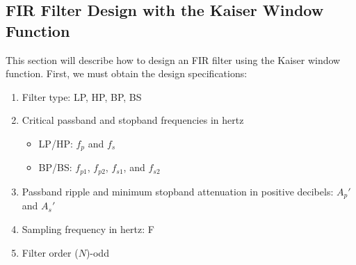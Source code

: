 \documentclass[11pt]{book}
\theoremstyle{example}
\begin{document}
\subsection{FIR Filter Design with the Kaiser Window Function}

This section will describe how to design an FIR filter using the Kaiser window function. First, we must obtain the design specifications:
\begin{enumerate}
	\item Filter type: LP, HP, BP, BS
	\item Critical passband and stopband frequencies in hertz
	\begin{itemize}
		\item LP/HP: $f_p$ and $f_s$
		\item BP/BS: $f_{p1}$, $f_{p2}$, $f_{s1}$, and $f_{s2}$
	\end{itemize}
	\item Passband ripple and minimum stopband attenuation in positive decibels: $A_p'$ and $A_s'$
	\item Sampling frequency in hertz: F
	\item Filter order ($N$)-odd	 
\end{enumerate}
\end{document}
